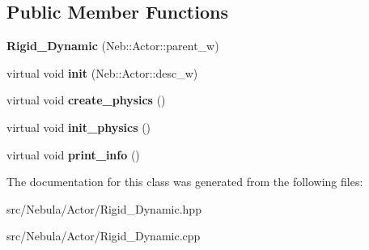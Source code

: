 \subsection*{\-Public \-Member \-Functions}
\begin{DoxyCompactItemize}
\item 
\hypertarget{classNeb_1_1Actor_1_1Rigid__Dynamic_a2e6a81583c34de2effef84f36d74d996}{{\bfseries \-Rigid\-\_\-\-Dynamic} (\-Neb\-::\-Actor\-::parent\-\_\-w)}\label{classNeb_1_1Actor_1_1Rigid__Dynamic_a2e6a81583c34de2effef84f36d74d996}

\item 
\hypertarget{classNeb_1_1Actor_1_1Rigid__Dynamic_a2180b5ed21dbb42162126a0dc3bb3c36}{virtual void {\bfseries init} (\-Neb\-::\-Actor\-::desc\-\_\-w)}\label{classNeb_1_1Actor_1_1Rigid__Dynamic_a2180b5ed21dbb42162126a0dc3bb3c36}

\item 
\hypertarget{classNeb_1_1Actor_1_1Rigid__Dynamic_a784a6718627cfa55994668c388c648e9}{virtual void {\bfseries create\-\_\-physics} ()}\label{classNeb_1_1Actor_1_1Rigid__Dynamic_a784a6718627cfa55994668c388c648e9}

\item 
\hypertarget{classNeb_1_1Actor_1_1Rigid__Dynamic_a25c3a55aa487167fbc7bc30078f3e03c}{virtual void {\bfseries init\-\_\-physics} ()}\label{classNeb_1_1Actor_1_1Rigid__Dynamic_a25c3a55aa487167fbc7bc30078f3e03c}

\item 
\hypertarget{classNeb_1_1Actor_1_1Rigid__Dynamic_a3f0eef890a878fb76d1572aa3a0c66ae}{virtual void {\bfseries print\-\_\-info} ()}\label{classNeb_1_1Actor_1_1Rigid__Dynamic_a3f0eef890a878fb76d1572aa3a0c66ae}

\end{DoxyCompactItemize}


\-The documentation for this class was generated from the following files\-:\begin{DoxyCompactItemize}
\item 
src/\-Nebula/\-Actor/\-Rigid\-\_\-\-Dynamic.\-hpp\item 
src/\-Nebula/\-Actor/\-Rigid\-\_\-\-Dynamic.\-cpp\end{DoxyCompactItemize}
